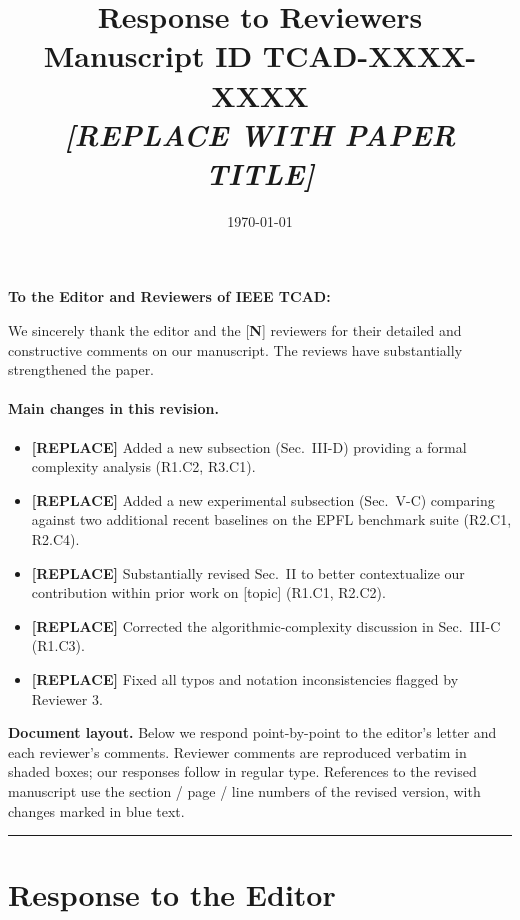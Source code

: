 \documentclass[11pt,letterpaper]{article}
\title{\vspace{-1.5em}Response to Reviewers \\
       \large Manuscript ID TCAD-XXXX-XXXX \\
       \textit{[REPLACE WITH PAPER TITLE]}}
\author{}
\date{\today}
\begin{document}
\maketitle
\vspace{-2em}


\noindent\textbf{To the Editor and Reviewers of IEEE TCAD:}

We sincerely thank the editor and the [\textbf{N}] reviewers for their
detailed and constructive comments on our manuscript. The reviews have
substantially strengthened the paper.

\paragraph{Main changes in this revision.}
\begin{itemize}[itemsep=2pt,topsep=2pt]
    \item \textbf{[REPLACE]} Added a new subsection (Sec.~III-D) providing
          a formal complexity analysis (R1.C2, R3.C1).
    \item \textbf{[REPLACE]} Added a new experimental subsection (Sec.~V-C)
          comparing against two additional recent baselines on the EPFL
          benchmark suite (R2.C1, R2.C4).
    \item \textbf{[REPLACE]} Substantially revised Sec.~II to better
          contextualize our contribution within prior work on
          [topic] (R1.C1, R2.C2).
    \item \textbf{[REPLACE]} Corrected the algorithmic-complexity
          discussion in Sec.~III-C (R1.C3).
    \item \textbf{[REPLACE]} Fixed all typos and notation inconsistencies
          flagged by Reviewer 3.
\end{itemize}

\noindent\textbf{Document layout.} Below we respond point-by-point to
the editor's letter and each reviewer's comments. Reviewer comments are
reproduced verbatim in shaded boxes; our responses follow in regular
type. References to the revised manuscript use the section / page / line
numbers of the revised version, with changes marked in blue text.

\hrule

\section*{Response to the Editor}
\end{document}
